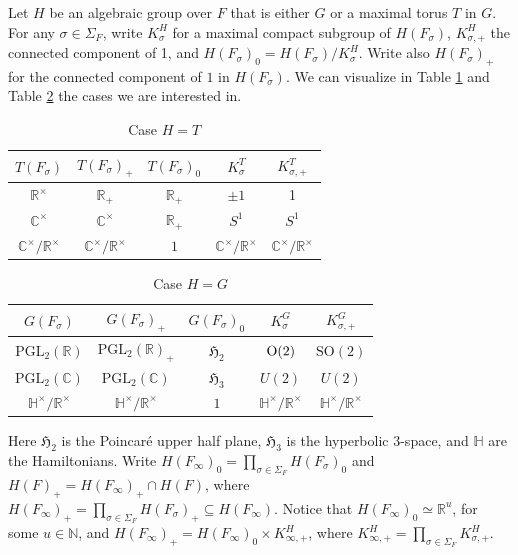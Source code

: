 \documentclass{amsart}
\theoremstyle{definition}
\theoremstyle{remark}
\numberwithin{equation}{section}
\newcommand{\PGL}{{\mathrm{PGL}}}
\newcommand{\SO}{{\mathrm {SO}}}
\newcommand{\bH}{{\mathbb H}}
\newcommand{\C}{{\mathbb C}}
\newcommand{\R}{{\mathbb R}}
\newcommand{\N}{{\mathbb N}}
\begin{document}
Let $H$ be an algebraic group over $F$ that is either $G$ or a maximal torus $T$ in $G$. For any $\sigma\in\Sigma_F$, write $K_{\sigma}^H$ for a maximal compact subgroup of $H(F_\sigma)$, $K_{\sigma,+}^H$ the connected component of 1, and $H(F_\sigma)_0=H(F_\sigma)/K_{\sigma}^H$.  
Write also $H(F_\sigma)_+$ for the connected component of $1$ in $H(F_\sigma)$. We can visualize  in Table \ref{table 1} and Table \ref{table 2} the cases we are interested in.


  \begin{table}[h!]
    \centering
\begin{tabular}{ c | c c c c}
$T(F_\sigma)$ & $T(F_\sigma)_+$&$T(F_\sigma)_0$&$K_\sigma^T$&$K_{\sigma,+}^T$ \\ 
 \hline
 $\R^\times$ & $\R_+$& $\R_+$& $\pm 1$ & 1\\  
  $\C^\times$ & $\C^\times$ & $\R_+$ & $S^1$& $S^1$ \\
  $\C^\times/\R^\times$ & $\C^\times/\R^\times$ & $1$ & $\C^\times/\R^\times$ & $\C^\times/\R^\times$ \\
\end{tabular}
\caption{Case $H=T$}
\label{table 1}

\end{table}
\begin{table}[h!]
  \centering
\begin{tabular}{ c | c c c c}
$G(F_\sigma)$ & $G(F_\sigma)_+$&$G(F_\sigma)_0$&$K_\sigma^G$&$K_{\sigma,+}^G$ \\ 
 \hline
  $\PGL_2(\R)$ & $\PGL_2(\R)_+$ & $\mathfrak{H}_2$ & ${\rm O}(2)$ & $\SO(2)$\\
  $\PGL_2(\C)$ & $\PGL_2(\C)$ & $\mathfrak{H}_3$ & $U(2)$ & $U(2)$\\
  $\bH^\times/\R^\times$ & $\bH^\times/\R^\times$ & $1$ & $\bH^\times/\R^\times$ & $\bH^\times/\R^\times$
\end{tabular}
\caption{Case $H=G$}
\label{table 2}
\end{table}


Here $\mathfrak{H}_2$ is the Poincar\'e upper half plane, $\mathfrak{H}_3$ is the hyperbolic 3-space, and $\bH$ are the Hamiltonians. Write $H(F_\infty)_0=\prod_{\sigma\in\Sigma_F}H(F_\sigma)_0$ and $H(F)_+=H(F_\infty)_+\cap H(F)$, where $H(F_\infty)_+=\prod_{\sigma\in\Sigma_F}H(F_\sigma)_+\subseteq H(F_\infty)$. Notice that $H(F_\infty)_0\simeq \R^u$, for some $u\in\N$, and 
$H(F_\infty)_+= H(F_\infty)_0\times K^H_{\infty,+}$, where $K^H_{\infty,+}=\prod_{\sigma\in\Sigma_F}K^H_{\sigma,+}$.
\end{document}
